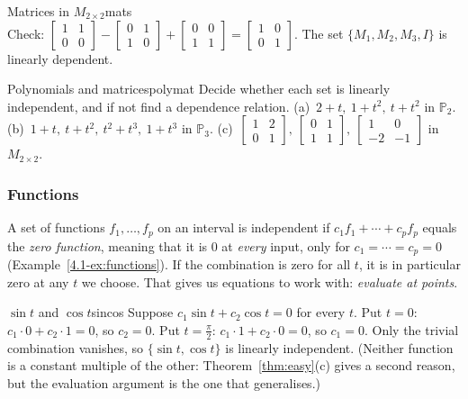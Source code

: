 \documentclass[11pt]{article}
\begin{document}
\begin{exmp}{Matrices in $M_{2\times2}$}{mats}
\[\]
Check: $\begin{bmatrix}1&1\\0&0\end{bmatrix}-\begin{bmatrix}0&1\\1&0\end{bmatrix}+\begin{bmatrix}0&0\\1&1\end{bmatrix}=\begin{bmatrix}1&0\\0&1\end{bmatrix}$. The set $\{M_1,M_2,M_3,I\}$ is linearly dependent.
\end{exmp}

\begin{kc}{Polynomials and matrices}{polymat}
Decide whether each set is linearly independent, and if not find a dependence relation. (a)~$2+t,\ 1+t^2,\ t+t^2$ in $\mathbb{P}_2$. (b)~$1+t,\ t+t^2,\ t^2+t^3,\ 1+t^3$ in $\mathbb{P}_3$. (c)~$\begin{bmatrix}1&2\\0&1\end{bmatrix},\ \begin{bmatrix}0&1\\1&1\end{bmatrix},\ \begin{bmatrix}1&0\\-2&-1\end{bmatrix}$ in $M_{2\times2}$.
\end{kc}

\subsubsection*{Functions}

A set of functions $f_1,\dots,f_p$ on an interval is independent if $c_1f_1+\cdots+c_pf_p$ equals the \emph{zero function}, meaning that it is $0$ at \emph{every} input, only for $c_1=\cdots=c_p=0$ (Example~\ref{4.1-ex:functions}). If the combination is zero for all $t$, it is in particular zero at any $t$ we choose. That gives us equations to work with: \emph{evaluate at points}.

\begin{exmp}{$\sin t$ and $\cos t$}{sincos}
Suppose $c_1\sin t+c_2\cos t=0$ for every $t$. Put $t=0$: $c_1\cdot0+c_2\cdot1=0$, so $c_2=0$. Put $t=\tfrac{\pi}{2}$: $c_1\cdot1+c_2\cdot0=0$, so $c_1=0$. Only the trivial combination vanishes, so $\{\sin t,\cos t\}$ is linearly independent. (Neither function is a constant multiple of the other: Theorem~\ref{thm:easy}(c) gives a second reason, but the evaluation argument is the one that generalises.)
\end{exmp}
\end{document}
